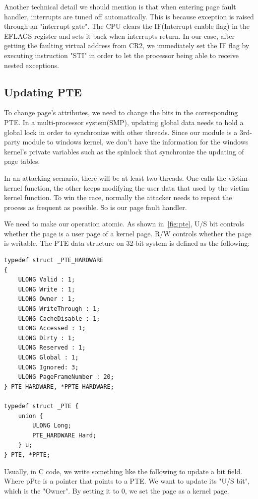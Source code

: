 Another technical detail we should mention is that when entering page fault handler, interrupts are tuned off automatically. This is because exception is raised through an "interrupt gate". The CPU clears the IF(Interrupt enable flag) in the EFLAGS register and sets it back when interrupts return. In our case, after getting the faulting virtual address from CR2, we immediately set the IF flag by executing instruction "STI" in order to let the processor being able to receive nested exceptions.

\subsection{Updating PTE}

To change page's attributes, we need to change the bits in the corresponding PTE. In a multi-processor system(SMP), updating global data needs to hold a global lock in order to synchronize with other threads. Since our module is a 3rd-party module to windows kernel, we don't have the information for the windows kernel's private variables such as the spinlock that synchronize the updating of page tables. 

In an attacking scenario, there will be at least two threads. One calls the victim kernel function, the other keeps modifying the user data that used by the victim kernel function. To win the race, normally the attacker needs to repeat the process as frequent as possible. So is our page fault handler. 

We need to make our operation atomic. As shown in~\autoref{fig:pte}, U/S bit controls whether the page is a user page of a kernel page. R/W controls whether the page is writable. The PTE data structure on 32-bit system is defined as the following:

\begin{lstlisting}[style=code] 
typedef struct _PTE_HARDWARE
{
	ULONG Valid : 1;
	ULONG Write : 1;
	ULONG Owner : 1;
	ULONG WriteThrough : 1;
	ULONG CacheDisable : 1;
	ULONG Accessed : 1;
	ULONG Dirty : 1;
	ULONG Reserved : 1;
	ULONG Global : 1;
	ULONG Ignored: 3;
	ULONG PageFrameNumber : 20;
} PTE_HARDWARE, *PPTE_HARDWARE;

typedef struct _PTE {
	union {
		ULONG Long;
		PTE_HARDWARE Hard;
	} u;
} PTE, *PPTE;
\end{lstlisting}


Usually, in C code, we write something like the following to update a bit field. Where pPte is a pointer that points to a PTE. We want to update its "U/S bit", which is the "Owner". By setting it to 0, we set the page as a kernel page. 

